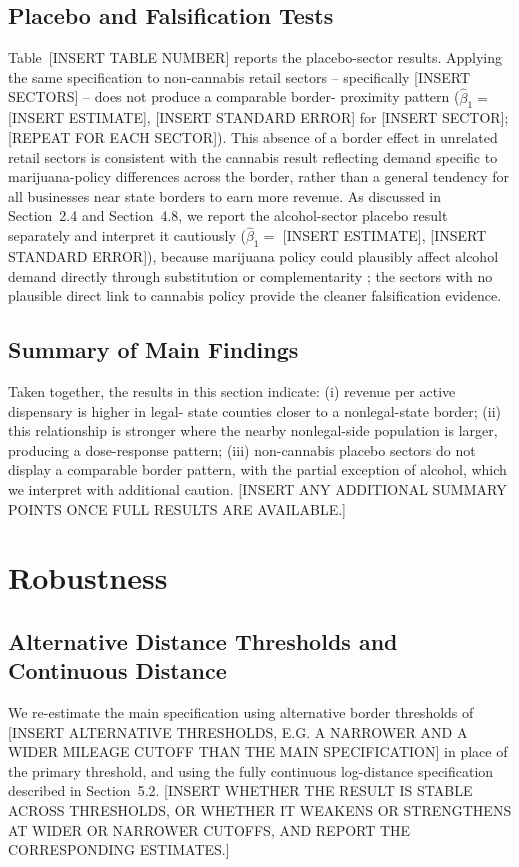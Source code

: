\documentclass[12pt]{article}
\begin{document}
\subsection{Placebo and Falsification Tests}
Table~[INSERT TABLE NUMBER] reports the placebo-sector results. Applying the same specification to
non-cannabis retail sectors -- specifically [INSERT SECTORS] -- does not produce a comparable border-
proximity pattern ($\hat\beta_1 = $ [INSERT ESTIMATE], [INSERT STANDARD ERROR] for [INSERT SECTOR]; [REPEAT
FOR EACH SECTOR]). This absence of a border effect in unrelated retail sectors is consistent with the
cannabis result reflecting demand specific to marijuana-policy differences across the border, rather than a
general tendency for all businesses near state borders to earn more revenue. As discussed in Section~2.4
and Section~4.8, we report the alcohol-sector placebo result separately and interpret it cautiously
($\hat\beta_1 = $ [INSERT ESTIMATE], [INSERT STANDARD ERROR]), because marijuana policy could plausibly
affect alcohol demand directly through substitution or complementarity \citep{BaggioChongKwon2020}; the
sectors with no plausible direct link to cannabis policy provide the cleaner falsification evidence.

\subsection{Summary of Main Findings}
Taken together, the results in this section indicate: (i) revenue per active dispensary is higher in legal-
state counties closer to a nonlegal-state border; (ii) this relationship is stronger where the nearby
nonlegal-side population is larger, producing a dose-response pattern; (iii) non-cannabis placebo sectors do
not display a comparable border pattern, with the partial exception of alcohol, which we interpret with
additional caution. [INSERT ANY ADDITIONAL SUMMARY POINTS ONCE FULL RESULTS ARE AVAILABLE.]

\section{Robustness}
\label{sec:robustness}

\subsection{Alternative Distance Thresholds and Continuous Distance}
We re-estimate the main specification using alternative border thresholds of [INSERT ALTERNATIVE
THRESHOLDS, E.G. A NARROWER AND A WIDER MILEAGE CUTOFF THAN THE MAIN SPECIFICATION] in place of the primary
threshold, and using the fully continuous log-distance specification described in Section~5.2. [INSERT
WHETHER THE RESULT IS STABLE ACROSS THRESHOLDS, OR WHETHER IT WEAKENS OR STRENGTHENS AT WIDER OR NARROWER
CUTOFFS, AND REPORT THE CORRESPONDING ESTIMATES.]
\end{document}
